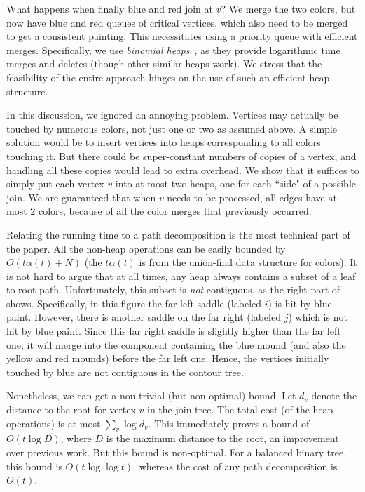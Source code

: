 {What happens when finally blue and red join at $v$? We merge the two colors, but now have
blue and red queues of critical vertices, which also need to be merged to get a consistent painting. 
This necessitates using a priority queue with efficient merges.
Specifically, we use \emph{binomial heaps}~\cite{Vu78}, as they provide logarithmic time merges and deletes (though other similar heaps work). 
We stress that the feasibility of the entire approach hinges on the use of such an efficient heap structure.

In this discussion, we ignored an annoying problem. Vertices
may actually be touched by numerous colors, not just one or two as assumed above. A simple solution
would be to insert vertices into heaps corresponding to all colors touching it. But there could
be super-constant numbers of copies of a vertex, and handling all these copies would lead
to extra overhead. We show that it suffices to simply put each vertex $v$ into at most two heaps, one for each
``side" of a possible join. We are guaranteed that when $v$ needs to be processed, all edges have
at most $2$ colors, because of all the color merges that previously occurred.


 Relating the running time to a path decomposition is the most technical part of the paper. 
All the non-heap operations can be easily bounded by $O(t\alpha(t) + N)$ (the $t\alpha(t)$ is from the union-find data structure
for colors). It is not hard to argue that at all times, any heap always contains a subset of a leaf
to root path. Unfortunately, this subset is \emph{not} contiguous, as the right part of  shows. 
Specifically, in this figure the far left saddle (labeled $i$) is hit by blue paint.  However, there is another 
saddle on the far right (labeled $j$) which is not hit by blue paint.  Since this far right saddle is slightly 
higher than the far left one, it will merge into the component containing the blue mound (and also the yellow and red mounds)
before the far left one.  Hence, the vertices initially touched by blue are not contiguous in the contour tree.

Nonetheless, we can get a non-trivial (but non-optimal) bound. Let $d_v$ denote the distance to the root for vertex $v$ in the join tree.
The total cost (of the heap operations) is at most $\sum_v \log d_v$. This immediately proves a bound of $O(t\log D)$, where
$D$ is the maximum distance to the root, an improvement over previous work. But this bound is non-optimal.
For a balanced binary tree, this bound is $O(t\log\log t)$, whereas the cost of any path decomposition is $O(t)$.

}

